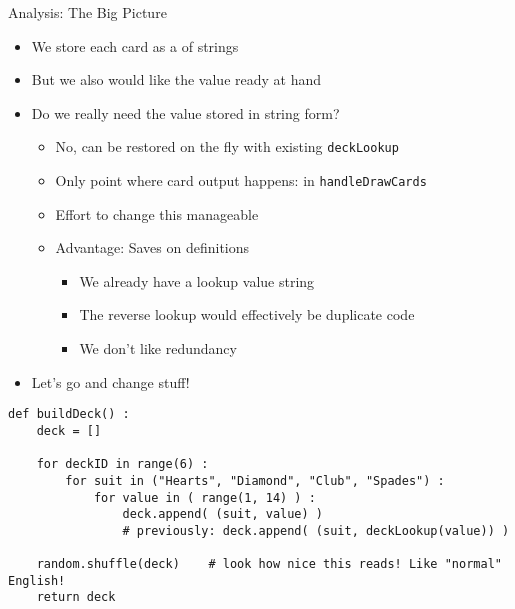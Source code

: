 \begin{frame}[fragile]{Analysis: The Big Picture}
%
\begin{itemize}
\item We store each card as a  of strings
\item But we also would like the value ready at hand
\item Do we really need the value stored in string form?
	\begin{itemize}
	\item No, can be restored on the fly with existing \texttt{deckLookup}
	\item Only point where card output happens: in \texttt{handleDrawCards}
	\item[\Thus] Effort to change this manageable
	\item Advantage: Saves on definitions
		\begin{itemize}
		\item We already have a lookup value \thus string
		\item The reverse lookup would effectively be duplicate code
		\item We don't like redundancy
		\end{itemize}
	\end{itemize}
\item Let's go and change stuff!
\end{itemize}
%
\end{frame}


\begin{frame}[fragile]
%
\begin{codebox}
\begin{verbatim}
def buildDeck() :
    deck = []
    
    for deckID in range(6) :
        for suit in ("Hearts", "Diamond", "Club", "Spades") :
            for value in ( range(1, 14) ) :
                deck.append( (suit, value) )
                # previously: deck.append( (suit, deckLookup(value)) )
    
    random.shuffle(deck)    # look how nice this reads! Like "normal" English!
    return deck
\end{verbatim}
\end{codebox}
%
\end{frame}


